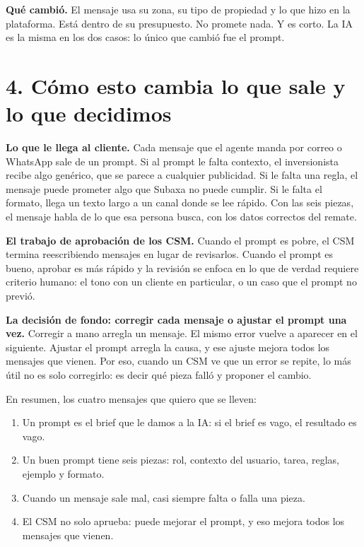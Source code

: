 \documentclass[11pt,letterpaper]{article}
\begin{document}
\textbf{Qué cambió.} El mensaje usa su zona, su tipo de propiedad y lo que
hizo en la plataforma. Está dentro de su presupuesto. No promete nada. Y es
corto. La IA es la misma en los dos casos: lo único que cambió fue el
prompt.

\section*{4. Cómo esto cambia lo que sale y lo que decidimos}

\textbf{Lo que le llega al cliente.} Cada mensaje que el agente manda por
correo o WhatsApp sale de un prompt. Si al prompt le falta contexto, el
inversionista recibe algo genérico, que se parece a cualquier publicidad. Si
le falta una regla, el mensaje puede prometer algo que Subaxa no puede
cumplir. Si le falta el formato, llega un texto largo a un canal donde se
lee rápido. Con las seis piezas, el mensaje habla de lo que esa persona
busca, con los datos correctos del remate.

\textbf{El trabajo de aprobación de los CSM.} Cuando el prompt es pobre,
el CSM termina reescribiendo mensajes en lugar de revisarlos. Cuando el
prompt es bueno, aprobar es más rápido y la revisión se enfoca en lo que de
verdad requiere criterio humano: el tono con un cliente en particular, o un
caso que el prompt no previó.

\textbf{La decisión de fondo: corregir cada mensaje o ajustar el prompt
una vez.} Corregir a mano arregla un mensaje. El mismo error vuelve a
aparecer en el siguiente. Ajustar el prompt arregla la causa, y ese ajuste
mejora todos los mensajes que vienen. Por eso, cuando un CSM ve que un
error se repite, lo más útil no es solo corregirlo: es decir qué pieza
falló y proponer el cambio.

En resumen, los cuatro mensajes que quiero que se lleven:

\begin{enumerate}
\item Un prompt es el brief que le damos a la IA: si el brief es vago, el
  resultado es vago.
\item Un buen prompt tiene seis piezas: rol, contexto del usuario, tarea,
  reglas, ejemplo y formato.
\item Cuando un mensaje sale mal, casi siempre falta o falla una pieza.
\item El CSM no solo aprueba: puede mejorar el prompt, y eso mejora todos
  los mensajes que vienen.
\end{enumerate}
\end{document}
